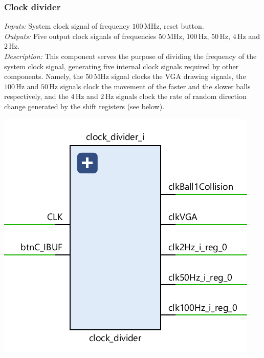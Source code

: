 \documentclass[11pt,a4paper]{article}
\def\MHz{\,\mathrm{MHz}}
\def\Hz{\,\mathrm{Hz}}
\begin{document}
        \subsubsection*{Clock divider}
        \begin{minipage}{.45\textwidth}
            \emph{Inputs:} System clock signal of frequency $100\MHz$, reset button.\\[1em]
            \emph{Outputs:} Five output clock signals of frequencies $50\MHz$, $100\Hz$, $50\Hz$, $4\Hz$ and $2\Hz$.\\[1em]
            \emph{Description:} This component serves the purpose of dividing the frequency of the system clock signal, generating five internal clock signals required by other components. Namely, the $50\MHz$ signal clocks the VGA drawing signals, the $100\Hz$ and $50\Hz$ signals clock the movement of the faster and the slower balls respectively, and the $4\Hz$ and $2\Hz$ signals clock the rate of random direction change generated by the shift registers (see below).
        \end{minipage}
        \hfill
        \begin{minipage}{.45\textwidth}
            \includegraphics[width=\textwidth]{src/clock-divider.png}
        \end{minipage}
\end{document}
